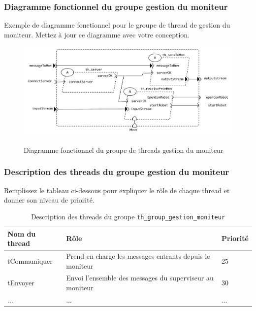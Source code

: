 \documentclass[11pt, a4paper]{paper}
\begin{document}
\subsubsection{Diagramme fonctionnel du groupe gestion du moniteur}

{\color{red} Exemple de diagramme fonctionnel pour le groupe de thread de gestion du moniteur. Mettez à jour ce diagramme avec votre conception.}

\begin{figure}[htbp]
\label{fig:diag_fonc_moniteur}
\begin{center}
{\includegraphics[scale=.5]{./figures-pdf/diag_fonc_moniteur}}
{\caption{Diagramme fonctionnel du groupe de threads gestion du moniteur}}
\end{center}
\end{figure}
\FloatBarrier

\subsubsection{Description des threads  du groupe gestion du moniteur}
{\color{red} Remplissez le tableau ci-dessous pour expliquer le rôle de chaque thread et donner son niveau de priorité.}


\begin{table}[htp]
\caption{Description des threads du groupe {\tt th\_group\_gestion\_moniteur}}
\begin{center}
\begin{tabular}{|p{3cm}|p{8.5cm}|p{2cm}|}
\hline
\bf Nom du thread &	\bf Rôle &	\bf Priorité \\
\hline
\hline
\color{blue}tCommuniquer	& \color{blue}Prend en charge les messages entrants depuis le moniteur & \color{blue}25\\
\hline
\color{blue}tEnvoyer	& \color{blue}Envoi l'ensemble des messages du superviseur au moniteur & \color{blue}30\\
\hline
\color{blue}... &	\color{blue}... &	\color{blue}...\\
\hline
\end{tabular}
\end{center}
\label{tab:gt_moniteur}
\end{table}%
\end{document}

